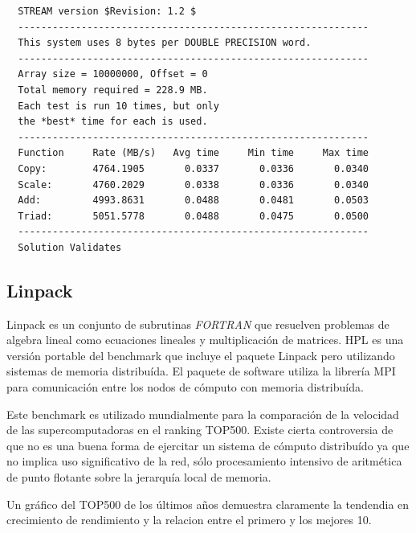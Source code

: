 \documentclass[a4paper]{report}
\begin{document}
\begin{verbatim}
  STREAM version $Revision: 1.2 $
  -------------------------------------------------------------
  This system uses 8 bytes per DOUBLE PRECISION word.
  -------------------------------------------------------------
  Array size = 10000000, Offset = 0
  Total memory required = 228.9 MB.
  Each test is run 10 times, but only
  the *best* time for each is used.
  -------------------------------------------------------------
  Function     Rate (MB/s)   Avg time     Min time     Max time
  Copy:        4764.1905       0.0337       0.0336       0.0340
  Scale:       4760.2029       0.0338       0.0336       0.0340
  Add:         4993.8631       0.0488       0.0481       0.0503
  Triad:       5051.5778       0.0488       0.0475       0.0500
  -------------------------------------------------------------
  Solution Validates
\end{verbatim}

\subsection{Linpack}

Linpack \cite{linpack} es un conjunto de subrutinas {\it FORTRAN} que resuelven
problemas de algebra lineal como ecuaciones lineales y multiplicaci\'on de
matrices. HPL \cite{hpl} es una versi\'on portable del benchmark que incluye
el paquete Linpack pero utilizando sistemas de memoria distribu\'ida. El
paquete de software utiliza la librer\'ia MPI para comunicaci\'on entre los
nodos de c\'omputo con memoria distribu\'ida.

\bigskip

Este benchmark es utilizado mundialmente para la comparaci\'on de la
velocidad de las supercomputadoras en el ranking TOP500. 
Existe cierta controversia de que no es una buena forma de ejercitar un
sistema de c\'omputo distribu\'ido ya que no implica uso significativo de la
red, s\'olo procesamiento intensivo de aritm\'etica de punto flotante
sobre la jerarqu\'ia local de memoria.

\bigskip

Un gr\'afico del TOP500 de los \'ultimos a\~nos demuestra claramente la
tendendia en crecimiento de rendimiento y la relacion entre el primero y los
mejores 10.
\end{document}
